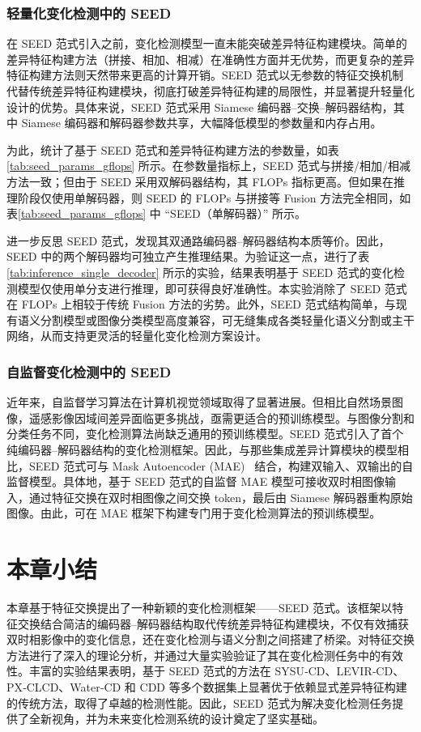 \subsubsection{轻量化变化检测中的 SEED}  
在 SEED 范式引入之前，变化检测模型一直未能突破差异特征构建模块。简单的差异特征构建方法（拼接、相加、相减）在准确性方面并无优势，而更复杂的差异特征构建方法则天然带来更高的计算开销。SEED 范式以无参数的特征交换机制代替传统差异特征构建模块，彻底打破差异特征构建的局限性，并显著提升轻量化设计的优势。具体来说，SEED 范式采用 Siamese 编码器–交换–解码器结构，其中 Siamese 编码器和解码器参数共享，大幅降低模型的参数量和内存占用。

为此，统计了基于 SEED 范式和差异特征构建方法的参数量，如表\ref{tab:seed_params_gflops} 所示。在参数量指标上，SEED 范式与拼接/相加/相减方法一致；但由于 SEED 采用双解码器结构，其 FLOPs 指标更高。但如果在推理阶段仅使用单解码器，则 SEED 的 FLOPs 与拼接等 Fusion 方法完全相同，如表\ref{tab:seed_params_gflops} 中 “SEED（单解码器）” 所示。

进一步反思 SEED 范式，发现其双通路编码器–解码器结构本质等价。因此，SEED 中的两个解码器均可独立产生推理结果。为验证这一点，进行了表\ref{tab:inference_single_decoder} 所示的实验，结果表明基于 SEED 范式的变化检测模型仅使用单分支进行推理，即可获得良好准确性。本实验消除了 SEED 范式在 FLOPs 上相较于传统 Fusion 方法的劣势。此外，SEED 范式结构简单，与现有语义分割模型或图像分类模型高度兼容，可无缝集成各类轻量化语义分割或主干网络，从而支持更灵活的轻量化变化检测方案设计。

\subsubsection{自监督变化检测中的 SEED}  
近年来，自监督学习算法在计算机视觉领域取得了显著进展。但相比自然场景图像，遥感影像因域间差异面临更多挑战，亟需更适合的预训练模型。与图像分割和分类任务不同，变化检测算法尚缺乏通用的预训练模型。SEED 范式引入了首个纯编码器–解码器结构的变化检测框架。因此，与那些集成差异计算模块的模型相比，SEED 范式可与 Mask Autoencoder (MAE)~\cite{he_masked_2021} 结合，构建双输入、双输出的自监督模型。具体地，基于 SEED 范式的自监督 MAE 模型可接收双时相图像输入，通过特征交换在双时相图像之间交换 token，最后由 Siamese 解码器重构原始图像。由此，可在 MAE 框架下构建专门用于变化检测算法的预训练模型。

\section{本章小结}  
本章基于特征交换提出了一种新颖的变化检测框架——SEED 范式。该框架以特征交换结合简洁的编码器–解码器结构取代传统差异特征构建模块，不仅有效捕获双时相影像中的变化信息，还在变化检测与语义分割之间搭建了桥梁。对特征交换方法进行了深入的理论分析，并通过大量实验验证了其在变化检测任务中的有效性。丰富的实验结果表明，基于 SEED 范式的方法在 SYSU‐CD、LEVIR‐CD、PX‐CLCD、Water‐CD 和 CDD 等多个数据集上显著优于依赖显式差异特征构建的传统方法，取得了卓越的检测性能。因此，SEED 范式为解决变化检测任务提供了全新视角，并为未来变化检测系统的设计奠定了坚实基础。  

